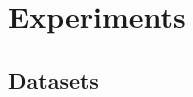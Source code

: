 \documentclass[letterpaper]{article}
\begin{document}

\section{Experiments}
\subsection{Datasets} \label{SC:dataset}
\end{document}
